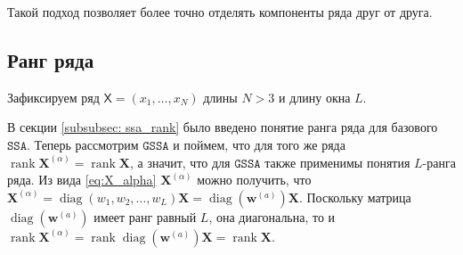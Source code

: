 \documentclass[12pt, specialist, subf
]{disser}
\theoremstyle{definition}
\newcommand{\SSA}{\texttt{SSA}}
\newcommand{\GSSA}{\texttt{GSSA}}
\newcommand{\TS}{\mathsf{X}}
\begin{document}
Такой подход позволяет более точно отделять компоненты ряда друг от друга.


\subsection{Ранг ряда}
Зафиксируем ряд $\TS = (x_1, \dots, x_{N})$ длины $N > 3$ и длину окна $L$.


В секции \ref{subsubsec: ssa_rank} было введено понятие ранга ряда для базового $\SSA$.
Теперь рассмотрим $\GSSA$ и поймем, что для того же ряда $\operatorname{rank} \mathbf{X}^{(\alpha)} = \operatorname{rank} \mathbf{X}$, а значит, что для $\GSSA$ также применимы понятия $L$-ранга ряда. Из вида \eqref{eq:X_alpha} $\mathbf{X}^{(\alpha)}$ можно получить, что $\mathbf{X}^{(\alpha)} = \operatorname{diag}\left(w_1, w_2, \dots, w_L \right) \mathbf{X} = \operatorname{diag}\left({\boldsymbol{w}}^{(a)}\right) \mathbf{X}$. Поскольку матрица $\operatorname{diag}\left({\boldsymbol{w}}^{(a)}\right)$ имеет ранг равный $L$, она диагональна, то и $\operatorname{rank} \mathbf{X}^{(\alpha)} = \operatorname{rank} \operatorname{diag}\left({\boldsymbol{w}}^{(a)}\right)\mathbf{X} = \operatorname{rank} \mathbf{X}$.
\end{document}
